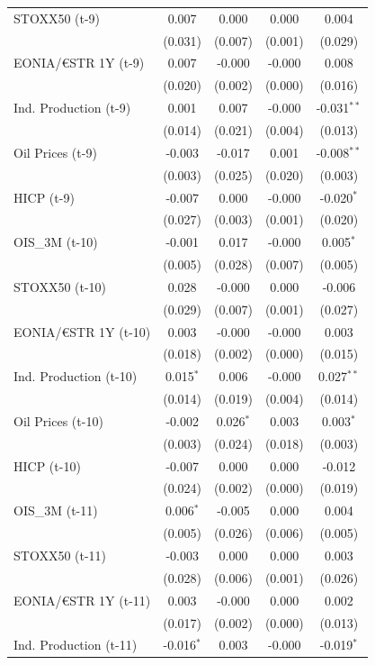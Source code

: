 \begin{longtable}[t]{lcccc}
STOXX50 (t-9) & 0.007 & 0.000 & 0.000 & 0.004\\
 & (0.031) & (0.007) & (0.001) & (0.029)\\
EONIA/€STR 1Y (t-9) & 0.007 & -0.000 & -0.000 & 0.008\\
 & (0.020) & (0.002) & (0.000) & (0.016)\\
Ind. Production (t-9) & 0.001 & 0.007 & -0.000 & -0.031$^{**}$\\
 & (0.014) & (0.021) & (0.004) & (0.013)\\
Oil Prices (t-9) & -0.003 & -0.017 & 0.001 & -0.008$^{**}$\\
 & (0.003) & (0.025) & (0.020) & (0.003)\\
HICP (t-9) & -0.007 & 0.000 & -0.000 & -0.020$^{*}$\\
 & (0.027) & (0.003) & (0.001) & (0.020)\\
OIS\_3M (t-10) & -0.001 & 0.017 & -0.000 & 0.005$^{*}$\\
 & (0.005) & (0.028) & (0.007) & (0.005)\\
STOXX50 (t-10) & 0.028 & -0.000 & 0.000 & -0.006\\
 & (0.029) & (0.007) & (0.001) & (0.027)\\
EONIA/€STR 1Y (t-10) & 0.003 & -0.000 & -0.000 & 0.003\\
 & (0.018) & (0.002) & (0.000) & (0.015)\\
Ind. Production (t-10) & 0.015$^{*}$ & 0.006 & -0.000 & 0.027$^{**}$\\
 & (0.014) & (0.019) & (0.004) & (0.014)\\
Oil Prices (t-10) & -0.002 & 0.026$^{*}$ & 0.003 & 0.003$^{*}$\\
 & (0.003) & (0.024) & (0.018) & (0.003)\\
HICP (t-10) & -0.007 & 0.000 & 0.000 & -0.012\\
 & (0.024) & (0.002) & (0.000) & (0.019)\\
OIS\_3M (t-11) & 0.006$^{*}$ & -0.005 & 0.000 & 0.004\\
 & (0.005) & (0.026) & (0.006) & (0.005)\\
STOXX50 (t-11) & -0.003 & 0.000 & 0.000 & 0.003\\
 & (0.028) & (0.006) & (0.001) & (0.026)\\
EONIA/€STR 1Y (t-11) & 0.003 & -0.000 & 0.000 & 0.002\\
 & (0.017) & (0.002) & (0.000) & (0.013)\\
Ind. Production (t-11) & -0.016$^{*}$ & 0.003 & -0.000 & -0.019$^{*}$\\

\end{longtable}
